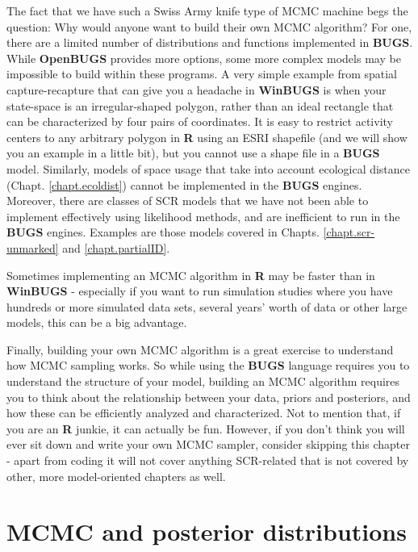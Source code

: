 The fact that we have such a Swiss Army knife type of MCMC machine
begs the question: Why would anyone want to build their own MCMC
algorithm? For one, there are a limited number of distributions and
functions implemented in {\bf BUGS}. While {\bf OpenBUGS} provides more
options, some more complex models may be impossible to build within
these programs. A very simple example from spatial capture-recapture
that can give you a headache in {\bf WinBUGS} is when your state-space is an
irregular-shaped polygon, rather than an ideal rectangle that can be
characterized by four pairs of coordinates. It is easy to restrict
activity centers to any arbitrary polygon in {\bf R} using an ESRI shapefile
(and we will show you an example in a little bit), but you cannot use
a shape file in a {\bf BUGS} model.  Similarly, models of space usage
that take into account ecological distance
(Chapt. \ref{chapt.ecoldist}) cannot be implemented in the {\bf BUGS}
engines.  Moreover, there are classes of 
SCR models that we have not been able to implement effectively using
likelihood methods, and are inefficient to run in the {\bf BUGS}
engines. Examples are those models covered in Chapts. 
\ref{chapt.scr-unmarked} and \ref{chapt.partialID}. 

Sometimes implementing an MCMC algorithm in {\bf R} may be faster than in
{\bf WinBUGS} - especially if you want to run simulation studies where you
have hundreds or more simulated data sets, several years' worth of
data or other large models, this can be a big advantage.

Finally, building your own MCMC algorithm is a great exercise to
understand how MCMC sampling works. So while using the {\bf BUGS}
language requires you to understand the structure of your model,
building an MCMC algorithm requires you to think about the
relationship between your data, priors and posteriors, and how these
can be efficiently analyzed and characterized. Not to mention that, if
you are an {\bf R} junkie, it can actually be fun.  However, if you
don't think you will ever sit down and write your own MCMC sampler,
consider skipping this chapter - apart from coding it will not cover
anything SCR-related that is not covered by other, more model-oriented
chapters as well.


\section{MCMC and posterior distributions}

